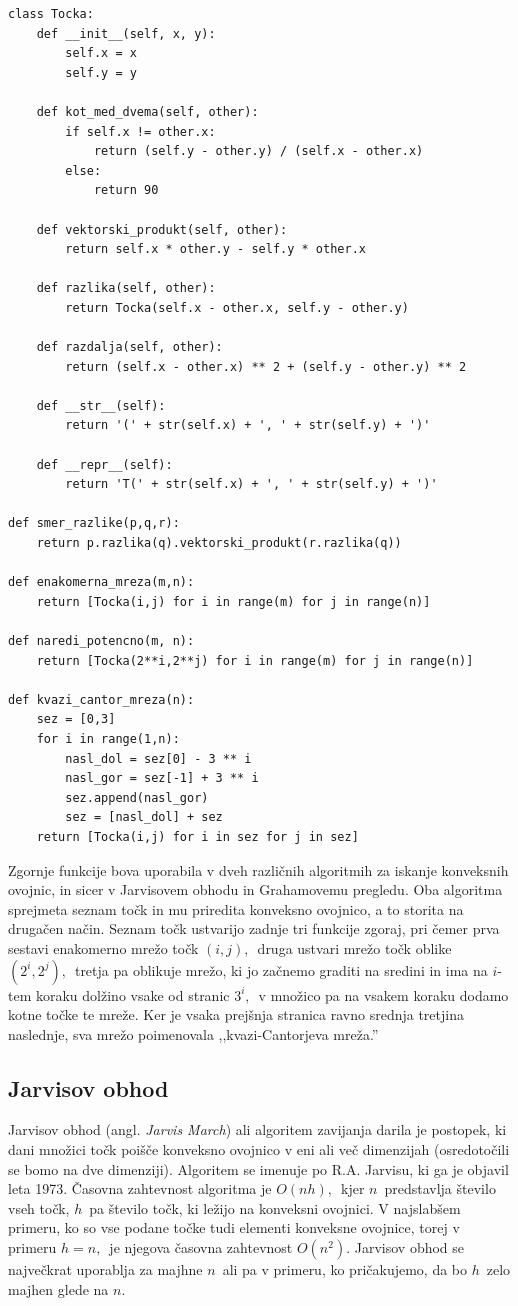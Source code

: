 \documentclass[a4paper]{article}
\begin{document}
\begin{lstlisting}
class Tocka:
    def __init__(self, x, y):
        self.x = x
        self.y = y

    def kot_med_dvema(self, other):
        if self.x != other.x:
            return (self.y - other.y) / (self.x - other.x)
        else:
            return 90

    def vektorski_produkt(self, other): 
        return self.x * other.y - self.y * other.x

    def razlika(self, other):
    	return Tocka(self.x - other.x, self.y - other.y)

    def razdalja(self, other):
        return (self.x - other.x) ** 2 + (self.y - other.y) ** 2

    def __str__(self):
        return '(' + str(self.x) + ', ' + str(self.y) + ')'

    def __repr__(self):
        return 'T(' + str(self.x) + ', ' + str(self.y) + ')'

def smer_razlike(p,q,r):
    return p.razlika(q).vektorski_produkt(r.razlika(q))

def enakomerna_mreza(m,n):
    return [Tocka(i,j) for i in range(m) for j in range(n)]

def naredi_potencno(m, n):
    return [Tocka(2**i,2**j) for i in range(m) for j in range(n)]

def kvazi_cantor_mreza(n):
    sez = [0,3]
    for i in range(1,n):
        nasl_dol = sez[0] - 3 ** i
        nasl_gor = sez[-1] + 3 ** i
        sez.append(nasl_gor)
        sez = [nasl_dol] + sez
    return [Tocka(i,j) for i in sez for j in sez]
\end{lstlisting}

Zgornje funkcije bova uporabila v dveh različnih algoritmih za iskanje konveksnih ovojnic, in sicer v Jarvisovem obhodu in Grahamovemu pregledu.
Oba algoritma sprejmeta seznam točk in mu priredita konveksno ovojnico, a to storita na drugačen način.
Seznam točk ustvarijo zadnje tri funkcije zgoraj, pri čemer prva sestavi enakomerno mrežo točk $(i, j),$~druga ustvari mrežo točk oblike $(2^i, 2^j),$~tretja pa oblikuje mrežo, ki
jo začnemo graditi na sredini in ima na $i$-tem koraku dolžino vsake od stranic $3^i,$~v množico pa na vsakem koraku dodamo kotne točke te mreže. Ker je vsaka prejšnja stranica
ravno srednja tretjina naslednje, sva mrežo poimenovala ,,kvazi-Cantorjeva mreža.''

\subsection{Jarvisov obhod}
Jarvisov obhod (angl. \textit{Jarvis March}) ali algoritem zavijanja darila je postopek, ki dani množici točk poišče konveksno ovojnico v eni ali več dimenzijah (osredotočili se 
bomo na dve dimenziji). Algoritem se imenuje po R.A. Jarvisu, ki ga je objavil leta 1973. Časovna zahtevnost algoritma je $O(nh),$~kjer $n$~predstavlja število vseh točk, $h$~pa 
število točk, ki ležijo na konveksni ovojnici. V najslabšem primeru, ko so vse podane točke tudi elementi konveksne ovojnice, torej v primeru $h = n,$~je njegova časovna zahtevnost 
$O(n^2)$. Jarvisov obhod se največkrat uporablja za majhne $n$~ali pa v primeru, ko pričakujemo, da bo $h$~zelo majhen glede na $n$.
\end{document}
